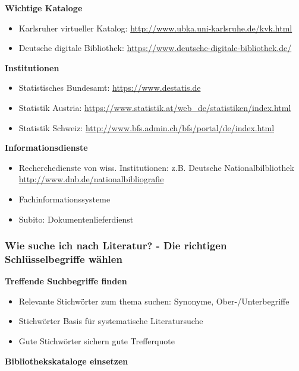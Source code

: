 \textbf{Wichtige Kataloge}

\begin{itemize}%
\item
  Karlsruher virtueller Katalog:
  \url{http://www.ubka.uni-karlsruhe.de/kvk.html}
\item
  Deutsche digitale Bibliothek:
  \url{https://www.deutsche-digitale-bibliothek.de/}
\end{itemize}

\textbf{Institutionen}

\begin{itemize}%
\item
  Statistisches Bundesamt: \url{https://www.destatis.de}
\item
  Statistik Austria:
  \url{https://www.statistik.at/web_de/statistiken/index.html}
\item
  Statistik Schweiz:
  \url{http://www.bfs.admin.ch/bfs/portal/de/index.html}
\end{itemize}

\textbf{Informationsdienste}

\begin{itemize}%
\item
  Recherchedienste von wiss. Institutionen: z.B. Deutsche
  Nationalbilbliothek \url{http://www.dnb.de/nationalbibliografie}
\item
  Fachinformationssysteme
\item
  Subito: Dokumentenlieferdienst
\end{itemize}

\subsubsection{Wie suche ich nach Literatur? - Die richtigen
Schlüsselbegriffe
wählen}\label{wie-suche-ich-nach-literatur-die-richtigen-schluesselbegriffe-waehlen}

\textbf{Treffende Suchbegriffe finden}

\begin{itemize}%
\item
  Relevante Stichwörter zum thema suchen: Synonyme, Ober-/Unterbegriffe
\item
  Stichwörter Basis für systematische Literatursuche
\item
  Gute Stichwörter sichern gute Trefferquote
\end{itemize}

\textbf{Bibliothekskataloge einsetzen}

